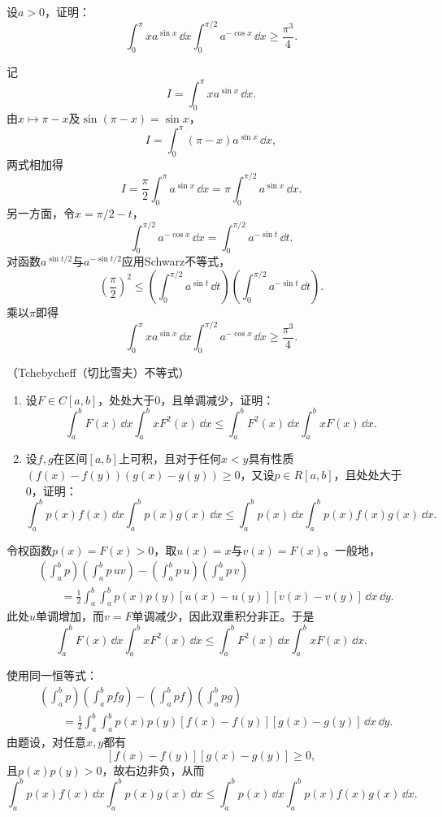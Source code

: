\begin{xreferenceproblem}[2]
设$a>0$，证明：
  \[
    \int_0^\pi xa^{\sin x}\,\dd x\int_0^{\pi/2}a^{-\cos x}\,\dd x\ge\frac{\pi^3}{4}.
  \]
\end{xreferenceproblem}
\begin{xsolution}
记
\[
 I=\int_0^\pi xa^{\sin x}\,\dd x.
\]
由$x\mapsto\pi-x$及$\sin(\pi-x)=\sin x$，
\[
 I=\int_0^\pi(\pi-x)a^{\sin x}\,\dd x,
\]
两式相加得
\[
 I=\frac\pi2\int_0^\pi a^{\sin x}\,\dd x
 =\pi\int_0^{\pi/2}a^{\sin x}\,\dd x.
\]
另一方面，令$x=\pi/2-t$，
\[
 \int_0^{\pi/2}a^{-\cos x}\,\dd x
 =\int_0^{\pi/2}a^{-\sin t}\,\dd t.
\]
对函数$a^{\sin t/2}$与$a^{-\sin t/2}$应用Schwarz不等式，
\[
 \left(\frac\pi2\right)^2
 \le\left(\int_0^{\pi/2}a^{\sin t}\,\dd t\right)
 \left(\int_0^{\pi/2}a^{-\sin t}\,\dd t\right).
\]
乘以$\pi$即得
\[
 \int_0^\pi xa^{\sin x}\,\dd x
 \int_0^{\pi/2}a^{-\cos x}\,\dd x
 \ge\frac{\pi^3}{4}.
\]
\end{xsolution}


\begin{xreferenceproblem}[3]
（Tchebycheff（切比雪夫）不等式）
  \begin{enumerate}[label=(\arabic*)]
    \item 设$F\in C[a,b]$，处处大于0，且单调减少，证明：
    \[
      \int_a^bF(x)\,\dd x\int_a^bxF^2(x)\,\dd x
      \le\int_a^bF^2(x)\,\dd x\int_a^bxF(x)\,\dd x.
    \]
    \item 设$f,g$在区间$[a,b]$上可积，且对于任何$x<y$具有性质$(f(x)-f(y))(g(x)-g(y))\ge0$，又设$p\in R[a,b]$，且处处大于0，证明：
    \[
      \int_a^bp(x)f(x)\,\dd x\int_a^bp(x)g(x)\,\dd x
      \le\int_a^bp(x)\,\dd x\int_a^bp(x)f(x)g(x)\,\dd x.
    \]
  \end{enumerate}
\end{xreferenceproblem}
\begin{xsolution}
令权函数$p(x)=F(x)>0$，取$u(x)=x$与$v(x)=F(x)$。一般地，
\begin{align*}
&\left(\int_a^bp\right)\left(\int_a^bp\,uv\right)
 -\left(\int_a^bp\,u\right)\left(\int_a^bp\,v\right)\\
&\qquad=\frac12\int_a^b\int_a^bp(x)p(y)
 [u(x)-u(y)][v(x)-v(y)]\,\dd x\,\dd y.
\end{align*}
此处$u$单调增加，而$v=F$单调减少，因此双重积分非正。于是
\[
 \int_a^bF(x)\,\dd x\int_a^bxF^2(x)\,\dd x
 \le\int_a^bF^2(x)\,\dd x\int_a^bxF(x)\,\dd x.
\]

使用同一恒等式：
\begin{align*}
&\left(\int_a^bp\right)\left(\int_a^bpfg\right)
 -\left(\int_a^bpf\right)
 \left(\int_a^bpg\right)\\
&\qquad=\frac12\int_a^b\int_a^bp(x)p(y)
 [f(x)-f(y)][g(x)-g(y)]\,\dd x\,\dd y.
\end{align*}
由题设，对任意$x,y$都有
\[
 [f(x)-f(y)][g(x)-g(y)]\ge0,
\]
且$p(x)p(y)>0$，故右边非负，从而
\[
 \int_a^bp(x)f(x)\,\dd x\int_a^bp(x)g(x)\,\dd x
 \le\int_a^bp(x)\,\dd x\int_a^bp(x)f(x)g(x)\,\dd x.
\]
\end{xsolution}


